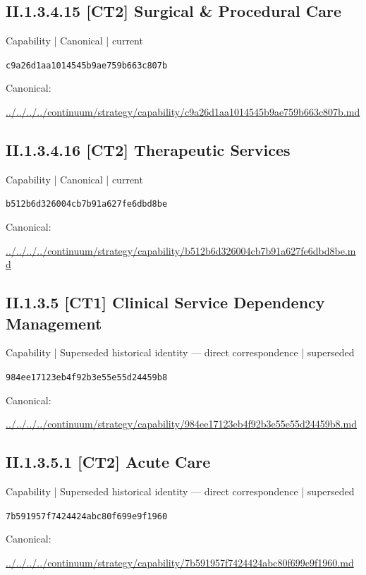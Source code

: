 \documentclass[10pt,a4paper]{article}
\begin{document}
\subsection*{II.1.3.4.15 [CT2] Surgical \& Procedural Care}
{\small Capability | Canonical | current}\par
\texttt{c9a26d1aa1014545b9ae759b663c807b}\par
Canonical: \par
{\footnotesize\url{../../../../continuum/strategy/capability/c9a26d1aa1014545b9ae759b663c807b.md}}\par
\subsection*{II.1.3.4.16 [CT2] Therapeutic Services}
{\small Capability | Canonical | current}\par
\texttt{b512b6d326004cb7b91a627fe6dbd8be}\par
Canonical: \par
{\footnotesize\url{../../../../continuum/strategy/capability/b512b6d326004cb7b91a627fe6dbd8be.md}}\par
\subsection*{II.1.3.5 [CT1] Clinical Service Dependency Management}
{\small Capability | Superseded historical identity — direct correspondence | superseded}\par
\texttt{984ee17123eb4f92b3e55e55d24459b8}\par
Canonical: \par
{\footnotesize\url{../../../../continuum/strategy/capability/984ee17123eb4f92b3e55e55d24459b8.md}}\par
\subsection*{II.1.3.5.1 [CT2] Acute Care}
{\small Capability | Superseded historical identity — direct correspondence | superseded}\par
\texttt{7b591957f7424424abc80f699e9f1960}\par
Canonical: \par
{\footnotesize\url{../../../../continuum/strategy/capability/7b591957f7424424abc80f699e9f1960.md}}\par
\end{document}
